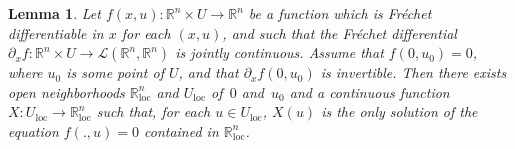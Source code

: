\documentclass[JEP,XML,SOM,Unicode,published]{cedram}
\newcommand{\loc}{\mathrm{loc}}
\newcommand{\Rm}{\mathbb{R}}
\newcommand{\mL}{\ensuremath{\mathcal{L}}}
\theoremstyle{plain}
\newtheorem{lem}{Lemma}
\theoremstyle{definition}
\begin{document}
\begin{lem}
Let $f(x,u):\Rm^n\times U\to \Rm^n$ be a function which is Fréchet differentiable in $x$ for each $(x,u)$, and such that
the Fréchet differential $\partial_xf:\Rm^n\times U\to \mL(\Rm^n,\Rm^n)$ is jointly continuous. Assume that $f(0,u_0)=0$, where $u_0$ is some point of $U$, and that $\partial_x f(0,u_0)$ is invertible. Then there exists open neighborhoods $\Rm^n_{\loc}$ and $U_{\loc}$ of~$0$ and~$u_0$ and a continuous function $X: U_{\loc}\to \Rm^n_{\loc}$ such that, for each $u\in U_{\loc}$,
$X(u)$ is the only solution of the equation $f(.,u)=0$ contained in $\Rm^n_{\loc}$.
\end{lem}

\backmatter


\end{document}
